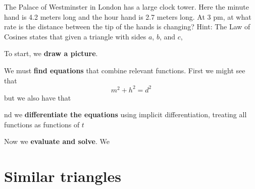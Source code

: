 \documentclass{ximera}
\begin{document}
\begin{example}
  The Palace of Westminster in London has a large clock tower.  Here
  the minute hand is 4.2 meters long and the hour hand is 2.7 meters
  long. At 3 pm, at what rate is the distance between the tip of the
  hands is changing? Hint: The Law of Cosines states that given a
  triangle with sides $a$, $b$, and $c$,

  \begin{explanation}
    To start, we \textbf{draw a picture}.
    \begin{image}
    \end{image}
    We must \textbf{find equations} that combine relevant
    functions. First we might see that
    \[
    m^2 + h^2 = d^2
    \]
    but we also have that 

    nd we \textbf{differentiate the equations} using implicit
    differentiation, treating all functions as functions of $t$

    Now we \textbf{evaluate and solve}.  We


  \end{explanation}
\end{example}



\section{Similar triangles}
\end{document}

